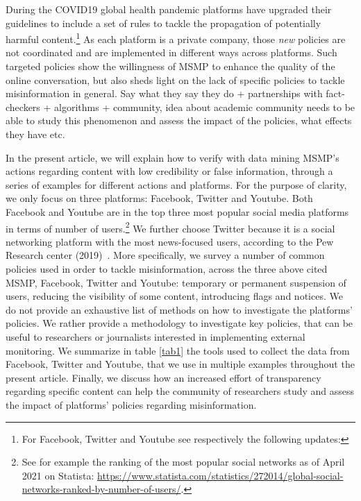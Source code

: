 \documentclass[11pt,a4paper]{article}
\begin{document}
\smallskip

During the COVID19 global health pandemic platforms have upgraded their guidelines to include a set of rules to tackle the propagation of potentially harmful content.\footnote{For Facebook, Twitter and Youtube see respectively the following updates: } As each platform is a private company, those {\it new} policies are not coordinated and are implemented in different ways across platforms. Such targeted policies show the willingness of MSMP to enhance the quality of the online conversation, but also sheds light on the lack of specific policies to tackle misinformation in general. {\color{pink} Say what they say they do + partnerships with fact-checkers + algorithms + community,  idea about academic community needs to be able to study this phenomenon and assess the impact of the policies, what effects they have etc.}

\smallskip

In the present article, we will explain how to verify with data mining MSMP's actions regarding content with low credibility or false information, through a series of examples for different actions and platforms. For the purpose of clarity, we only focus on three platforms: Facebook, Twitter and Youtube. Both Facebook and Youtube are in the top three most popular social media platforms in terms of number of users.\footnote{See for example the ranking of the most popular social networks as of April 2021 on Statista: \href{https://www.statista.com/statistics/272014/global-social-networks-ranked-by-number-of-users/}{https://www.statista.com/statistics/272014/global-social-networks-ranked-by-number-of-users/}.} We further choose Twitter because it is a social networking platform with the most news-focused users, according to the Pew Research center (2019)~\cite{pew1}. More specifically, we survey a number of common policies used in order to tackle misinformation, across the three above cited MSMP, Facebook, Twitter and Youtube: temporary or permanent suspension of users, reducing the visibility of some content, introducing flags and notices. We do not provide  an exhaustive list of methods on how to investigate the platforms’ policies. We rather provide a methodology to investigate key policies, that can be useful to researchers or journalists interested in implementing external monitoring. We summarize in table \ref{tab1} the tools used to collect the data from Facebook, Twitter and Youtube, that we use in multiple examples throughout the present article. Finally, we discuss how an increased effort of transparency regarding specific content can help the community of researchers study and assess the impact of platforms' policies regarding misinformation.  %
\end{document}
